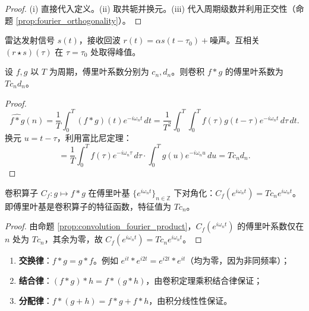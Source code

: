\begin{proof}
(i) 直接代入定义。(ii) 取共轭并换元。(iii) 代入周期级数并利用正交性（命题 \ref{prop:fourier_orthogonality}）。
\end{proof}

\begin{example}\label{ex:echo_delay}
雷达发射信号 $s(t)$，接收回波 $r(t) = \alpha s(t - \tau_0) + \text{噪声}$。互相关 $(r \star s)(\tau)$ 在 $\tau = \tau_0$ 处取得峰值。
\end{example}

\begin{proposition}[卷积与傅里叶变换的乘积定理]\label{prop:convolution_fourier_product}
设 $f, g$ 以 $T$ 为周期，傅里叶系数分别为 $c_n, d_n$。则卷积 $f * g$ 的傅里叶系数为 $T c_n d_n$。
\end{proposition}

\begin{proof}
\[
\widehat{f * g}(n) = \frac{1}{T}\int_0^T (f * g)(t) e^{-i\omega_n t}\,dt = \frac{1}{T^2}\int_0^T \int_0^T f(\tau) g(t-\tau) e^{-i\omega_n t}\,d\tau\,dt.
\]
换元 $u = t - \tau$，利用富比尼定理：
\[
= \frac{1}{T} \int_0^T f(\tau) e^{-i\omega_n \tau}\,d\tau \cdot \int_0^T g(u) e^{-i\omega_n u}\,du = T c_n d_n.
\]
\end{proof}

\begin{corollary}[卷积算子的对角化]\label{cor:convolution_diagonalisation}
卷积算子 $C_f: g \mapsto f * g$ 在傅里叶基 $\{e^{i\omega_n t}\}_{n \in \mathbb{Z}}$ 下对角化：$C_f(e^{i\omega_n t}) = T c_n e^{i\omega_n t}$。即傅里叶基是卷积算子的特征函数，特征值为 $T c_n$。
\end{corollary}

\begin{proof}
由命题 \ref{prop:convolution_fourier_product}，$C_f(e^{i\omega_n t})$ 的傅里叶系数仅在 $n$ 处为 $T c_n$，其余为零，故 $C_f(e^{i\omega_n t}) = T c_n e^{i\omega_n t}$。
\end{proof}

\begin{example}[卷积的三个代数性质]\label{ex:convolution_algebra_example}
\begin{enumerate}[label=(\roman*)]
  \item \textbf{交换律}：$f * g = g * f$。例如 $e^{it} * e^{i2t} = e^{i2t} * e^{it}$（均为零，因为非同频率）；
  \item \textbf{结合律}：$(f * g) * h = f * (g * h)$，由卷积定理乘积结合律保证；
  \item \textbf{分配律}：$f * (g + h) = f * g + f * h$，由积分线性性保证。
\end{enumerate}
\end{example}

